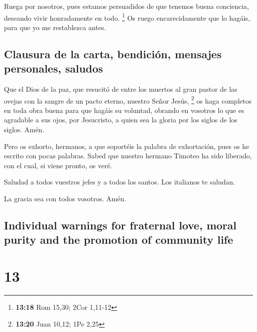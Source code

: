 \begin{paracol}{2}
 Ruega por nosotros, pues estamos persuadidos de que
tenemos buena conciencia, deseando vivir honradamente en todo.
\footnote{\textbf{13:18} Rom 15,30; 2Cor 1,11-12}  Os
ruego encarecidamente que lo hagáis, para que yo me restablezca antes.

\hypertarget{clausura-de-la-carta-bendiciuxf3n-mensajes-personales-saludos}{%
\subsection{Clausura de la carta, bendición, mensajes personales,
saludos}\label{clausura-de-la-carta-bendiciuxf3n-mensajes-personales-saludos}}

 Que el Dios de la paz, que resucitó de entre los muertos
al gran pastor de las ovejas con la sangre de un pacto eterno, nuestro
Señor Jesús, \footnote{\textbf{13:20} Juan 10,12; 1Pe 2,25}
 os haga completos en toda obra buena para que hagáis su
voluntad, obrando en vosotros lo que es agradable a sus ojos, por
Jesucristo, a quien sea la gloria por los siglos de los siglos. Amén.

 Pero os exhorto, hermanos, a que soportéis la palabra de
exhortación, pues os he escrito con pocas palabras. 
Sabed que nuestro hermano Timoteo ha sido liberado, con el cual, si
viene pronto, os veré.

 Saludad a todos vuestros jefes y a todos los santos. Los
italianos te saludan.

 La gracia sea con todos vosotros. Amén. \switchcolumn
\begin{otherlanguage}{english}

\hypertarget{individual-warnings-for-fraternal-love-moral-purity-and-the-promotion-of-community-life}{%
\subsection{Individual warnings for fraternal love, moral purity and the
promotion of community
life}\label{individual-warnings-for-fraternal-love-moral-purity-and-the-promotion-of-community-life}}

\hypertarget{section-25}{%
\section{13}\label{section-25}}


\end{otherlanguage}
\end{paracol}
